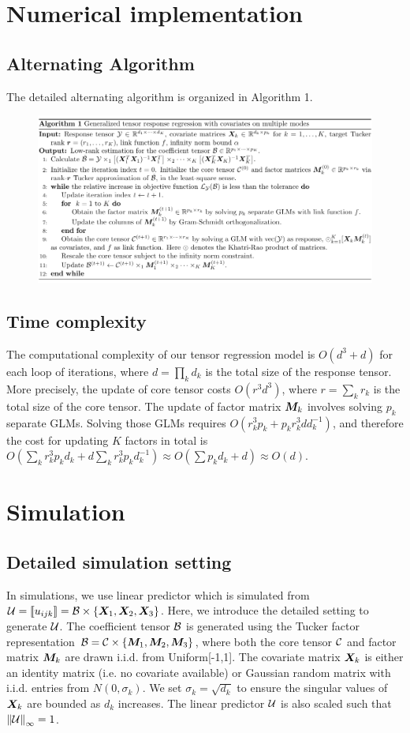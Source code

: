 \documentclass[11pt]{article}
\theoremstyle{plain}
\theoremstyle{definition}
\begin{document}
\section{Numerical implementation}
\subsection{Alternating Algorithm}
The detailed alternating algorithm is organized in Algorithm 1.

\begin{figure}[http]
  \includegraphics[width=16cm]{algorithm.pdf} \label{alg:1}
\end{figure}

\subsection{Time complexity}
The computational complexity of our tensor regression model is $O(d^3+d)$ for each loop of iterations, where $d=\prod_k d_k$ is the total size of the response tensor. More precisely, the update of core tensor costs $O(r^3d^3)$, where $r=\sum_k r_k$ is the total size of the core tensor. The update of factor matrix $\bm M_k$ involves solving $p_k$ separate GLMs. Solving those GLMs requires $O(r_k^3 p_k + p_kr_k^3 dd^{-1}_k)$, and therefore the cost for updating $K$ factors in total is $O( \sum_k r^3_k p_k d_k + d\sum_k r_k^3 p_k d_k^{-1})\approx O(\sum p_k d_k +d)\approx O(d)$. 

\section{Simulation}
\subsection{Detailed simulation setting}
In simulations, we use linear predictor which is simulated from $\mathcal{U} = \llbracket u_{ijk} \rrbracket = \mathcal{B} \times \{\bm X_1,\bm X_2,\bm X_3\}$. Here, we introduce the detailed setting to generate $\mathcal{U}$. The coefficient tensor $\mathcal{B}$ is generated using the Tucker factor representation $\mathcal{B} = \mathcal{C} \times \{ \bm M_1,\bm M_2,\bm M_3 \}$, where both the core tensor $\mathcal{C}$ and factor matrix $\bm M_k$ are drawn i.i.d. from Uniform[-1,1]. The covariate matrix $\bm X_k$ is either an identity matrix (i.e.  no covariate available) or Gaussian random matrix with i.i.d.  entries from $N(0,\sigma_k)$. We set $\sigma_k = \sqrt{d_k}$ to ensure the singular values of $\bm X_k$ are bounded as $d_k$ increases. The  linear predictor $\mathcal{U}$ is also scaled such that $\left\lVert\mathcal{U}\right\rVert_\infty = 1$.
\end{document}
